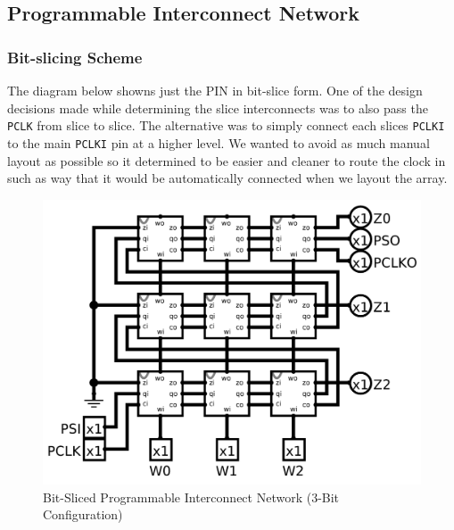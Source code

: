 \documentclass{article}
\begin{document}
    \newpage
    \subsection{Programmable Interconnect Network}

        \subsubsection{Bit-slicing Scheme}
        The diagram below showns just the PIN in bit-slice form. One of the
        design decisions made while determining the slice interconnects was to
        also pass the \texttt{PCLK} from slice to slice. The alternative was to
        simply connect each slices \texttt{PCLKI} to the main \texttt{PCLKI}
        pin at a higher level. We wanted to avoid as much manual layout as
        possible so it determined to be easier and cleaner to route the clock
        in such as way that it would be automatically connected when we layout
        the array.
        \begin{figure}[H]
            \centering
            \includegraphics[width=0.5\linewidth]{../../logisim/pin.png}
            \caption{Bit-Sliced Programmable Interconnect Network (3-Bit Configuration)}
        \end{figure}
\end{document}
